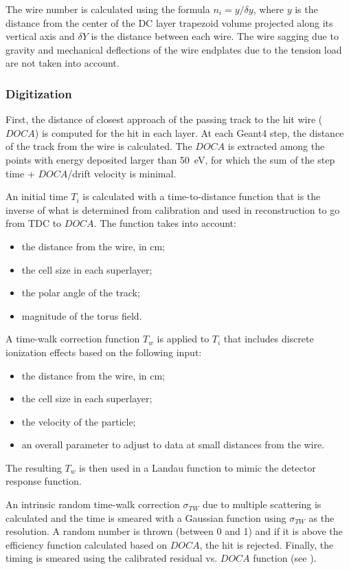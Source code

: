The wire number is calculated using the formula $n_i = y/\delta y$, where $y$ is the distance from the center of the
DC layer trapezoid volume projected along its vertical axis and $\delta Y$ is the distance between each wire. The wire
sagging due to gravity and mechanical deflections of the wire endplates due to the tension load are not taken into account.

\subsubsection{Digitization}

First, the distance of closest approach of the passing track to the hit wire ($DOCA$) is computed for the hit in each layer.
At each Geant4 step, the distance of the track from the wire is calculated. The $DOCA$ is extracted among the points
with energy deposited larger than 50~eV, for which the sum of the step time + $DOCA$/drift velocity is minimal.

An initial time $T_i$ is calculated with a time-to-distance function that is the inverse of what is determined from
calibration and used in reconstruction to go from TDC to $DOCA$. The function takes into account:

\begin{itemize}
	\item the distance from the wire, in cm;
	\item the cell size in each superlayer;
	\item the polar angle of the track;
	\item magnitude of the torus field.
\end{itemize}

A time-walk correction function $T_w$ is applied to $T_i$ that includes discrete ionization effects based on the
following input:

\begin{itemize}
	\item the distance from the wire, in cm;
	\item the cell size in each superlayer;
	\item the velocity of the particle;
	\item an overall parameter to adjust to data at small distances from the wire.
\end{itemize}

\noindent The resulting $T_w$ is then used in a Landau function to mimic the detector response function.

An intrinsic random time-walk correction $\sigma_{TW}$ due to multiple scattering is calculated and the time is smeared
with a Gaussian function using $\sigma_{TW}$ as the resolution. A random number is thrown (between 0 and 1) and if it is
above the efficiency function calculated based on $DOCA$, the hit is rejected. Finally, the timing is smeared using the
calibrated residual vs. $DOCA$ function (see ).

